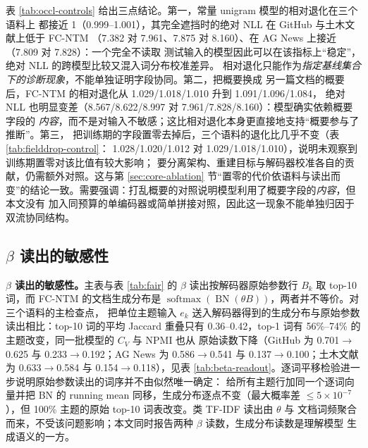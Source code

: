 \documentclass[11pt]{ctexart}
\newcommand{\fcntm}{FC-NTM}
\begin{document}
表 \ref{tab:occl-controls} 给出三点结论。第一，常量 unigram 模型的相对退化在三个语料上
都接近 1（0.999--1.001），其完全遮挡时的绝对 NLL 在 GitHub 与土木文献上低于 \fcntm{}
（7.382 对 7.961、7.875 对 8.160）、在 AG News 上接近（7.809 对 7.828）：一个完全不读取
测试输入的模型因此可以在该指标上“稳定”，绝对 NLL 的跨模型比较又混入词分布校准差异。
相对退化只能作为\emph{指定基线集合下的诊断现象}，不能单独证明字段协同。第二，把概要换成
另一篇文档的概要后，\fcntm{} 的相对退化从 1.029/1.018/1.010 升到 1.091/1.096/1.084，
绝对 NLL 也明显变差（8.567/8.622/8.997 对 7.961/7.828/8.160）：模型确实依赖概要字段的
\emph{内容}，而不是对输入不敏感；这比相对退化本身更直接地支持“概要参与了推断”。第三，
把训练期的字段置零去掉后，三个语料的退化比几乎不变（表 \ref{tab:fielddrop-control}：
1.028/1.020/1.012 对 1.029/1.018/1.010），说明未观察到训练期置零对该比值有较大影响；
要分离架构、重建目标与解码器校准各自的贡献，仍需额外对照。这与第 \ref{sec:core-ablation}
节“置零的代价依语料与读出而变”的结论一致。需要强调：打乱概要的对照说明模型利用了概要字段的\emph{内容}，但本文没有
加入同预算的单编码器或简单拼接对照，因此这一现象不能单独归因于双流协同结构。

\subsection{$\beta$ 读出的敏感性}
\label{app:beta-readout}

\textbf{$\beta$ 读出的敏感性。}主表与表 \ref{tab:fair} 的 $\beta$ 读出按解码器原始参数行
$B_k$ 取 top-10 词，而 \fcntm{} 的文档生成分布是
$\operatorname{softmax}(\operatorname{BN}(\theta B))$，两者并不等价。对三个语料的主检查点，
把单位主题输入 $e_k$ 送入解码器得到的生成分布与原始参数读出相比：top-10 词的平均 Jaccard
重叠只有 0.36--0.42，top-1 词有 56\%--74\% 的主题改变，同一批模型的 $C_V$ 与 NPMI 也从
原始读数下降（GitHub 为 0.701$\rightarrow$0.625 与 0.233$\rightarrow$0.192；AG News 为
0.586$\rightarrow$0.541 与 0.137$\rightarrow$0.100；土木文献为 0.633$\rightarrow$0.584 与
0.154$\rightarrow$0.118），见表 \ref{tab:beta-readout}。逐词平移检验进一步说明原始参数读出的词序并不由似然唯一确定：
给所有主题行加同一个逐词向量并把 BN 的 running mean 同移，生成分布逐点不变（最大概率差
$\leq 5\times10^{-7}$），但 100\% 主题的原始 top-10 词表改变。类 TF-IDF 读出由 $\theta$ 与
文档词频聚合而来，不受该问题影响；本文同时报告两种 $\beta$ 读数，生成分布读数是理解模型
生成语义的一方。
\end{document}
